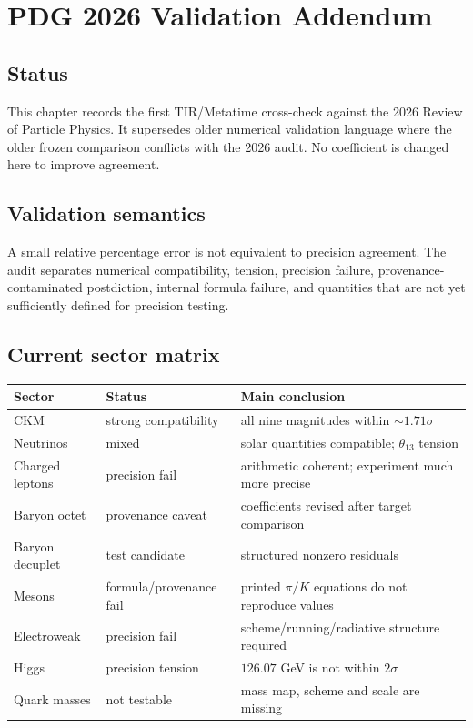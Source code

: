 \chapter{PDG 2026 Validation Addendum}
\label{ch:pdg2026_addendum}


\section{Status}
This chapter records the first TIR/Metatime cross-check against the 2026
Review of Particle Physics.  It supersedes older numerical validation language
where the older frozen comparison conflicts with the 2026 audit.  No coefficient
is changed here to improve agreement.

\section{Validation semantics}
A small relative percentage error is not equivalent to precision agreement.
The audit separates numerical compatibility, tension, precision failure,
provenance-contaminated postdiction, internal formula failure, and quantities
that are not yet sufficiently defined for precision testing.

\section{Current sector matrix}
\begin{center}
\begin{tabular}{lll}
\toprule
Sector & Status & Main conclusion\\
\midrule
CKM & strong compatibility & all nine magnitudes within $\sim1.71\sigma$\\
Neutrinos & mixed & solar quantities compatible; $\theta_{13}$ tension\\
Charged leptons & precision fail & arithmetic coherent; experiment much more precise\\
Baryon octet & provenance caveat & coefficients revised after target comparison\\
Baryon decuplet & test candidate & structured nonzero residuals\\
Mesons & formula/provenance fail & printed $\pi/K$ equations do not reproduce values\\
Electroweak & precision fail & scheme/running/radiative structure required\\
Higgs & precision tension & $126.07$ GeV is not within $2\sigma$\\
Quark masses & not testable & mass map, scheme and scale are missing\\
\bottomrule
\end{tabular}
\end{center}

